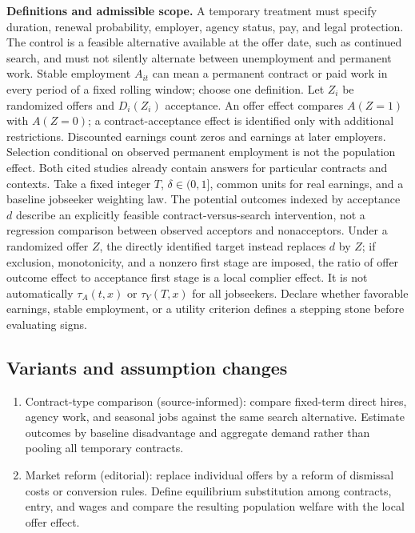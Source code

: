 \documentclass[11pt,a4paper]{article}
\begin{document}
\textbf{Definitions and admissible scope.} A temporary treatment must specify duration, renewal probability, employer, agency status, pay, and legal protection. The control is a feasible alternative available at the offer date, such as continued search, and must not silently alternate between unemployment and permanent work. Stable employment \(A_{it}\) can mean a permanent contract or paid work in every period of a fixed rolling window; choose one definition. Let \(Z_i\) be randomized offers and \(D_i(Z_i)\) acceptance. An offer effect compares \(A(Z=1)\) with \(A(Z=0)\); a contract-acceptance effect is identified only with additional restrictions. Discounted earnings count zeros and earnings at later employers. Selection conditional on observed permanent employment is not the population effect. Both cited studies already contain answers for particular contracts and contexts. Take a fixed integer \(T\), \(\delta\in(0,1]\), common units for real earnings, and a baseline jobseeker weighting law. The potential outcomes indexed by acceptance \(d\) describe an explicitly feasible contract-versus-search intervention, not a regression comparison between observed acceptors and nonacceptors. Under a randomized offer \(Z\), the directly identified target instead replaces \(d\) by \(Z\); if exclusion, monotonicity, and a nonzero first stage are imposed, the ratio of offer outcome effect to acceptance first stage is a local complier effect. It is not automatically \(\tau_A(t,x)\) or \(\tau_Y(T,x)\) for all jobseekers. Declare whether favorable earnings, stable employment, or a utility criterion defines a stepping stone before evaluating signs.
\subsection*{Variants and assumption changes}
\begin{enumerate}
\item Contract-type comparison (source-informed): compare fixed-term direct hires, agency work, and seasonal jobs against the same search alternative. Estimate outcomes by baseline disadvantage and aggregate demand rather than pooling all temporary contracts.
\item Market reform (editorial): replace individual offers by a reform of dismissal costs or conversion rules. Define equilibrium substitution among contracts, entry, and wages and compare the resulting population welfare with the local offer effect.
\end{enumerate}
\end{document}
